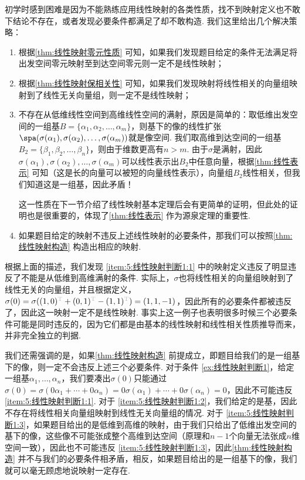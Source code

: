 初学时感到困难是因为不能熟练应用线性映射的各类性质，找不到映射定义也不敢下结论不存在，或者发现必要条件都满足了却不敢构造. 我们这里给出几个解决策略：
\begin{enumerate}
    \item \label{item:5:线性映射判断1:1}
          根据\autoref{thm:线性映射零元性质} 可知，如果我们发现题目给定的条件无法满足将出发空间零元映射至到达空间零元则一定不是线性映射；

    \item \label{item:5:线性映射判断1:2}
          根据\autoref{thm:线性映射保相关性} 可知，如果我们发现映射将线性相关的向量组映射到了线性无关向量组，则一定不是线性映射；

    \item \label{item:5:线性映射判断1:3}
          不存在从低维线性空间到高维线性空间的满射，原因是简单的：取低维出发空间的一组基$B=\{\alpha_1,\alpha_2,\ldots,\alpha_m\}$，则基下的像的线性扩张$\spa(\sigma(\alpha_1),\sigma(\alpha_2),\ldots,\sigma(\alpha_m))$就是像空间. 我们取高维到达空间的一组基$B_2=\{\beta_1,\beta_2,\ldots,\beta_n\}$，则由于维数更高有$n>m$. 由于$\sigma$是满射，因此$\sigma(\alpha_1),\sigma(\alpha_2),\ldots,\sigma(\alpha_m)$可以线性表示出$B_2$中任意向量，根据\autoref{thm:线性表示} 可知（这是长的向量可以被短的向量线性表示），向量组$B_2$线性相关，但我们知道这是一组基，因此矛盾！

          这一性质在下一节介绍了线性映射基本定理后会有更简单的证明，但此处的证明也是很重要的，体现了\autoref{thm:线性表示} 作为源泉定理的重要性.

    \item 如果题目给定的映射不违反上述线性映射的必要条件，那我们可以按照\autoref{thm:线性映射构造} 构造出相应的映射.
\end{enumerate}

根据上面的描述，我们发现 \ref*{item:5:线性映射判断1:1} 中的映射定义违反了明显违反了不能是从低维到高维满射的条件. 实际上，$\sigma$也将线性相关的向量组映射到了线性无关的向量组，并且根据定义，$\sigma(0)=\sigma((1,0)^{\color{lightgray}\mathrm{T}}+(0,1)^{\color{lightgray}\mathrm{T}}-(1,1)^{\color{lightgray}\mathrm{T}})=(1,1,-1)$，因此所有的必要条件都被违反了，因此这一映射一定不是线性映射. 事实上这一例子也表明很多时候三个必要条件可能是同时违反的，因为它们都是由基本的线性映射和线性相关性质推导而来，并非完全独立的判据.

我们还需强调的是，如果\autoref{thm:线性映射构造} 前提成立，即题目给我们的是一组基下的像，则一定不会违反上述三个必要条件. 对于条件 \ref*{ex:线性映射判断1}，给定一组基$\alpha_1,\ldots,\alpha_n$，我们要凑出$\sigma(0)$只能通过$\sigma(0)=\sigma(0\alpha_1+\cdots+0\alpha_n)=0\sigma(\alpha_1)+\cdots+0\sigma(\alpha_n)=0$，因此不可能违反  \ref*{item:5:线性映射判断1:1}. 对于 \ref*{item:5:线性映射判断1:2}，我们给定的是基，因此不存在将线性相关向量组映射到线性无关向量组的情况. 对于 \ref*{item:5:线性映射判断1:3}，如果题目给出的是低维到高维的映射，由于我们只给出了低维出发空间的基下的像，这些像不可能张成整个高维到达空间（原理和$n-1$个向量无法张成$n$维空间一致），因此也不可能违反 \ref*{item:5:线性映射判断1:3}，因此\autoref{thm:线性映射构造} 并不与我们的必要条件相矛盾，相反，如果题目给出的是一组基下的像，我们就可以毫无顾虑地说映射一定存在.

